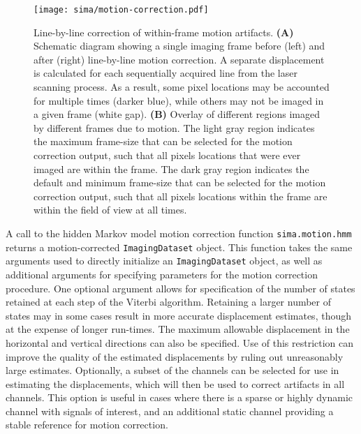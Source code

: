 \begin{figure}[hb!]
\centering
\texttt{[image: sima/motion-correction.pdf]}
\caption[Line-by-line correction of within-frame motion artifacts]{
 	Line-by-line correction of within-frame motion artifacts.
 	\textbf{(A)} Schematic diagram showing a single imaging frame before (left) and after (right)  line-by-line motion correction. 
	A separate displacement is calculated for each sequentially acquired line from the laser scanning process. As a result, some pixel locations may be accounted for multiple times (darker blue), while others may not be imaged in a given frame (white gap).
	\textbf{(B)} Overlay of different regions imaged by different frames due to motion. The light gray region indicates the maximum frame-size that can be selected for the motion correction output, such that all pixels locations that were ever imaged are within the frame. The dark gray region indicates the default and minimum frame-size that can be selected for the motion correction output, such that all pixels locations within the frame are within the field of view at all times.
 	}
 	\label{fig:sima:motion}
\end{figure}

A call to the hidden Markov model motion correction function \verb|sima.motion.hmm| returns a
motion-corrected \verb|ImagingDataset| object.
This function takes the same arguments used to directly initialize an
\verb|ImagingDataset| object, as well as additional arguments for specifying
parameters for the motion correction procedure.
One optional argument allows for specification of the number of states retained 
at each step of the Viterbi algorithm.
Retaining a larger number of states may in some cases result in more accurate
displacement estimates, though at the expense of longer run-times.
The maximum allowable displacement in the horizontal and vertical directions 
can also be specified. 
Use of this restriction can improve the quality of the estimated displacements
by ruling out unreasonably large estimates.
Optionally, a subset of the channels can be selected for use in estimating
the displacements, which will then be used to correct artifacts in all channels.
This option is useful in cases where there is a sparse or highly dynamic channel with
signals of interest, and an additional static channel providing a stable
reference for motion correction.

